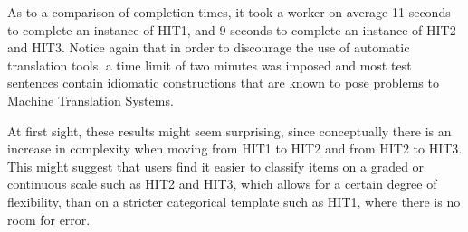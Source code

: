 \documentclass[11pt, a4paper,onecolumn]{article}
\begin{document}
As to a comparison of completion times, it took a worker on average 11 seconds to complete an instance of HIT1, and 9 seconds to complete an instance of HIT2 and HIT3. Notice again that in order to discourage the use of automatic translation tools, a time limit of two minutes was  imposed and most test sentences contain idiomatic constructions that are known to pose problems to Machine Translation Systems.

At first sight, these results might seem surprising, since conceptually there is an increase in complexity when moving from HIT1 to HIT2 and from HIT2 to HIT3. This might suggest that users find it easier to classify items on a graded or continuous scale such as HIT2 and HIT3, which allows for a certain degree of flexibility, than on a stricter categorical template such as HIT1, where there is no room for error.
\end{document}

